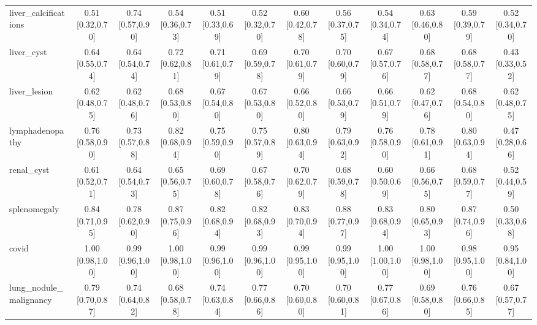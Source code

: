 \begin{tabular}{lccccccccccc}
liver\_calcifications & 0.51 [0.32,0.70] & 0.74 [0.57,0.90] & 0.54 [0.36,0.73] & 0.51 [0.33,0.69] & 0.52 [0.32,0.70] & 0.60 [0.42,0.78] & 0.56 [0.37,0.75] & 0.54 [0.34,0.74] & 0.63 [0.46,0.80] & 0.59 [0.39,0.79] & 0.52 [0.34,0.70] \\
liver\_cyst & 0.64 [0.55,0.74] & 0.64 [0.54,0.74] & 0.72 [0.62,0.81] & 0.71 [0.61,0.79] & 0.69 [0.59,0.78] & 0.70 [0.61,0.79] & 0.70 [0.60,0.79] & 0.67 [0.57,0.76] & 0.68 [0.58,0.77] & 0.68 [0.58,0.77] & 0.43 [0.33,0.52] \\
liver\_lesion & 0.62 [0.48,0.75] & 0.62 [0.48,0.76] & 0.68 [0.53,0.80] & 0.67 [0.54,0.80] & 0.67 [0.53,0.80] & 0.66 [0.52,0.80] & 0.66 [0.53,0.79] & 0.66 [0.51,0.79] & 0.62 [0.47,0.76] & 0.68 [0.54,0.80] & 0.62 [0.48,0.75] \\
lymphadenopathy & 0.76 [0.58,0.90] & 0.73 [0.57,0.88] & 0.82 [0.68,0.94] & 0.75 [0.59,0.90] & 0.75 [0.57,0.89] & 0.80 [0.63,0.94] & 0.79 [0.63,0.92] & 0.76 [0.58,0.90] & 0.78 [0.61,0.91] & 0.80 [0.63,0.94] & 0.47 [0.28,0.66] \\
renal\_cyst & 0.61 [0.52,0.71] & 0.64 [0.54,0.73] & 0.65 [0.56,0.75] & 0.69 [0.60,0.78] & 0.67 [0.58,0.76] & 0.70 [0.62,0.79] & 0.68 [0.59,0.78] & 0.60 [0.50,0.69] & 0.66 [0.56,0.75] & 0.68 [0.59,0.77] & 0.52 [0.44,0.59] \\
splenomegaly & 0.84 [0.71,0.95] & 0.78 [0.62,0.90] & 0.87 [0.75,0.96] & 0.82 [0.68,0.94] & 0.82 [0.68,0.93] & 0.83 [0.70,0.94] & 0.88 [0.77,0.97] & 0.83 [0.68,0.94] & 0.80 [0.65,0.93] & 0.87 [0.74,0.96] & 0.50 [0.33,0.68] \\
covid & 1.00 [0.98,1.00] & 0.99 [0.96,1.00] & 1.00 [0.98,1.00] & 0.99 [0.96,1.00] & 0.99 [0.96,1.00] & 0.99 [0.95,1.00] & 0.99 [0.95,1.00] & 1.00 [1.00,1.00] & 1.00 [0.98,1.00] & 0.98 [0.95,1.00] & 0.95 [0.84,1.00] \\
lung\_nodule\_malignancy & 0.79 [0.70,0.87] & 0.74 [0.64,0.82] & 0.68 [0.58,0.78] & 0.74 [0.63,0.84] & 0.77 [0.66,0.86] & 0.70 [0.60,0.80] & 0.70 [0.60,0.81] & 0.77 [0.67,0.86] & 0.69 [0.58,0.80] & 0.76 [0.66,0.85] & 0.67 [0.57,0.77] \\
\bottomrule
\end{tabular}
